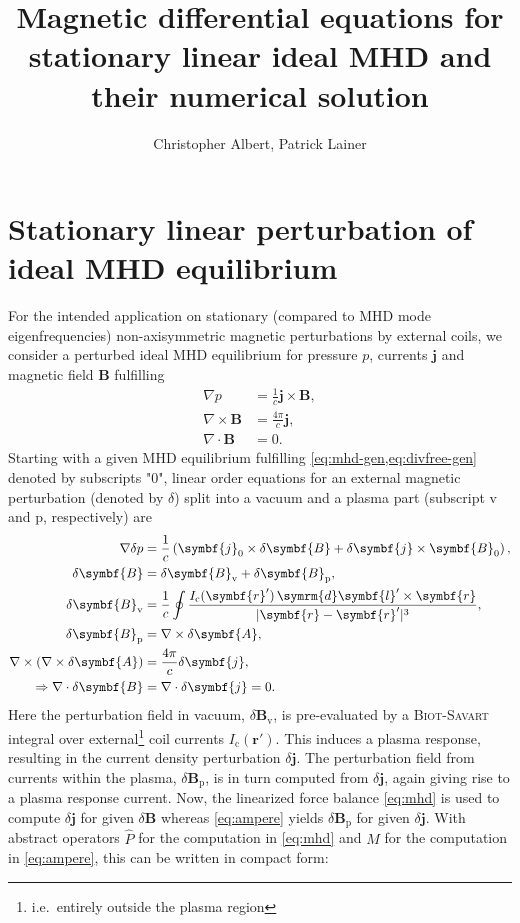 \documentclass[a4paper, 10pt, english]{article}
\title{Magnetic differential equations for stationary linear ideal MHD and their numerical solution}
\author{Christopher Albert, Patrick Lainer}
\let\vec\symbf
\newcommand*\diff{\ensuremath{\symrm{d}}}  %
\begin{document}
\maketitle
\tableofcontents

\section{Stationary linear perturbation of ideal MHD equilibrium}

For the intended application on stationary (compared to MHD mode eigenfrequencies) non-axisymmetric magnetic perturbations by external coils, we consider a perturbed ideal MHD equilibrium for pressure $p$, currents $\vec{j}$ and magnetic field $\vec{B}$ fulfilling
\begin{align}
  \nabla p &= \frac{1}{c} \vec{j} \times \vec{B}, \label{eq:mhd-gen} \\
  \nabla \times \vec{B} &= \frac{4 \pi}{c} \vec{j}, \label{eq:ampere-gen} \\
  \nabla \cdot \vec{B} &= 0. \label{eq:divfree-gen}
\end{align}
Starting with a given MHD equilibrium fulfilling \cref{eq:mhd-gen,eq:divfree-gen} denoted by subscripts "$0$", linear order equations for an external magnetic perturbation (denoted by $\delta$) split into a vacuum and a plasma part (subscript $\text{v}$ and $\text{p}$, respectively) are
\begin{align}
  \nabla \delta p &= \frac{1}{c} \left( \vec{j}_{0} \times \delta \vec{B} + \delta \vec{j} \times \vec{B}_{0} \right), \label{eq:mhd} \\
  \delta \vec{B} &= \delta \vec{B}_{\text{v}} + \delta \vec{B}_{\text{p}}, \\
  \delta \vec{B}_{\text{v}} &= \frac{1}{c} \oint \frac{I_{\text{c}}(\vec{r}') \, \diff \vec{l}' \times \vec{r}}{\lvert \vec{r} - \vec{r}' \rvert^{3}}, \\
  \delta \vec{B}_{\text{p}} &= \nabla \times \delta \vec{A}, \\
  \nabla \times (\nabla \times \delta \vec{A}) &= \frac{4 \pi}{c} \delta \vec{j}, \label{eq:ampere} \\
  \Rightarrow \nabla \cdot \delta \vec{B} &= \nabla \cdot \delta \vec{j} = 0. \label{eq:divfree}
\end{align}
Here the perturbation field in vacuum, $\delta \vec{B}_{\text{v}}$, is pre-evaluated by a \textsc{Biot-Savart} integral over external\footnote{i.e.\ entirely outside the plasma region} coil currents $I_{\text{c}} (\vec{r}')$. This induces a plasma response, resulting in the current density perturbation $\delta \vec{j}$. The perturbation field from currents within the plasma, $\delta \vec{B}_{\text{p}}$, is in turn computed from $\delta \vec{j}$, again giving rise to a plasma response current. Now, the linearized force balance \cref{eq:mhd} is used to compute $\delta \vec{j}$ for given $\delta \vec{B}$ whereas \cref{eq:ampere} yields $\delta \vec{B}_{\text{p}}$ for given $\delta \vec{j}$. With abstract operators $\hat{P}$ for the computation in \cref{eq:mhd} and $\hat{M}$ for the computation in \cref{eq:ampere}, this can be written in compact form:
\end{document}
